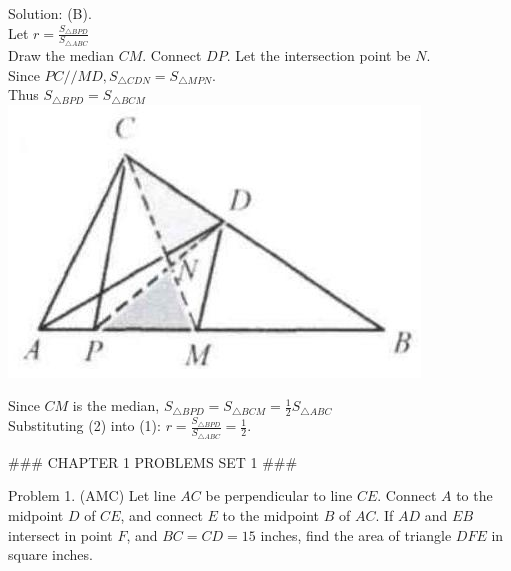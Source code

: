 \documentclass[10pt]{article}
\begin{document}
Solution: (B).\\
Let \(r=\frac{S_{\triangle B P D}}{S_{\triangle A B C}}\)\\
Draw the median \(C M\). Connect \(D P\). Let the intersection point be \(N\).\\
Since \(P C / / M D, S_{\triangle C D N}=S_{\triangle M P N}\).\\
Thus \(S_{\triangle B P D}=S_{\triangle B C M}\)\\
\includegraphics[max width=\textwidth, center]{2025_04_17_97bc1f7e44d93c271a88g-014}

Since \(C M\) is the median, \(S_{\triangle B P D}=S_{\triangle B C M}=\frac{1}{2} S_{\triangle A B C}\)\\
Substituting (2) into (1): \(r=\frac{S_{\triangle B P D}}{S_{\triangle A B C}}=\frac{1}{2}\).


### CHAPTER 1 PROBLEMS SET 1 ###

Problem 1. (AMC) Let line \(A C\) be perpendicular to line \(C E\). Connect \(A\) to the midpoint \(D\) of \(C E\), and connect \(E\) to the midpoint \(B\) of \(A C\). If \(A D\) and \(E B\) intersect in point \(F\), and \(B C=C D=15\) inches, find the area of triangle \(D F E\) in square inches.
\end{document}
